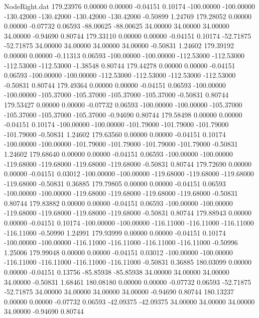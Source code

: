 \begin{filecontents}{NodeRight.dat}
 179.23976    0.00000    0.00000    -0.04151    0.10174 -100.00000 -100.00000 -130.42000 -130.42000 -130.42000 -130.42000   -0.50899    1.24769
 179.28052    0.00000    0.00000    -0.07732    0.06593  -88.00625  -88.00625   34.00000   34.00000   34.00000   34.00000   -0.94690    0.80744
 179.33110    0.00000    0.00000    -0.04151    0.10174  -52.71875  -52.71875   34.00000   34.00000   34.00000   34.00000   -0.50831    1.24602
 179.39192    0.00000    0.00000    -0.11313    0.06593 -100.00000 -100.00000 -112.53000 -112.53000 -112.53000 -112.53000   -1.38548    0.80744
 179.44278    0.00000    0.00000    -0.04151    0.06593 -100.00000 -100.00000 -112.53000 -112.53000 -112.53000 -112.53000   -0.50831    0.80744
 179.49364    0.00000    0.00000    -0.04151    0.06593 -100.00000 -100.00000 -105.37000 -105.37000 -105.37000 -105.37000   -0.50831    0.80744
 179.53427    0.00000    0.00000    -0.07732    0.06593 -100.00000 -100.00000 -105.37000 -105.37000 -105.37000 -105.37000   -0.94690    0.80744
 179.58498    0.00000    0.00000    -0.04151    0.10174 -100.00000 -100.00000 -101.79000 -101.79000 -101.79000 -101.79000   -0.50831    1.24602
 179.63560    0.00000    0.00000    -0.04151    0.10174 -100.00000 -100.00000 -101.79000 -101.79000 -101.79000 -101.79000   -0.50831    1.24602
 179.68640    0.00000    0.00000    -0.04151    0.06593 -100.00000 -100.00000 -119.68000 -119.68000 -119.68000 -119.68000   -0.50831    0.80744
 179.72690    0.00000    0.00000    -0.04151    0.03012 -100.00000 -100.00000 -119.68000 -119.68000 -119.68000 -119.68000   -0.50831    0.36885
 179.79805    0.00000    0.00000    -0.04151    0.06593 -100.00000 -100.00000 -119.68000 -119.68000 -119.68000 -119.68000   -0.50831    0.80744
 179.83882    0.00000    0.00000    -0.04151    0.06593 -100.00000 -100.00000 -119.68000 -119.68000 -119.68000 -119.68000   -0.50831    0.80744
 179.88943    0.00000    0.00000    -0.04151    0.10174 -100.00000 -100.00000 -116.11000 -116.11000 -116.11000 -116.11000   -0.50990    1.24991
 179.93999    0.00000    0.00000    -0.04151    0.10174 -100.00000 -100.00000 -116.11000 -116.11000 -116.11000 -116.11000   -0.50996    1.25006
 179.99048    0.00000    0.00000    -0.04151    0.03012 -100.00000 -100.00000 -116.11000 -116.11000 -116.11000 -116.11000   -0.50831    0.36885
 180.03099    0.00000    0.00000    -0.04151    0.13756  -85.85938  -85.85938   34.00000   34.00000   34.00000   34.00000   -0.50831    1.68461
 180.08180    0.00000    0.00000    -0.07732    0.06593  -52.71875  -52.71875   34.00000   34.00000   34.00000   34.00000   -0.94690    0.80744
 180.13237    0.00000    0.00000    -0.07732    0.06593  -42.09375  -42.09375   34.00000   34.00000   34.00000   34.00000   -0.94690    0.80744

\end{filecontents}
